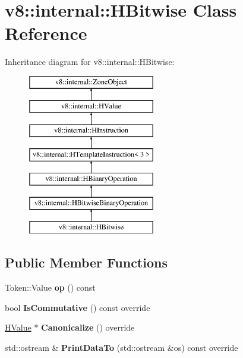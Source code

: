 \hypertarget{classv8_1_1internal_1_1_h_bitwise}{}\section{v8\+:\+:internal\+:\+:H\+Bitwise Class Reference}
\label{classv8_1_1internal_1_1_h_bitwise}
Inheritance diagram for v8\+:\+:internal\+:\+:H\+Bitwise\+:\begin{figure}[H]
\begin{center}
\leavevmode
\includegraphics[height=7.000000cm]{classv8_1_1internal_1_1_h_bitwise}
\end{center}
\end{figure}
\subsection*{Public Member Functions}
\begin{DoxyCompactItemize}
\item 
Token\+::\+Value {\bfseries op} () const \hypertarget{classv8_1_1internal_1_1_h_bitwise_ad141bf769041a02ff3b13ec3ef31aa75}{}\label{classv8_1_1internal_1_1_h_bitwise_ad141bf769041a02ff3b13ec3ef31aa75}

\item 
bool {\bfseries Is\+Commutative} () const  override\hypertarget{classv8_1_1internal_1_1_h_bitwise_a5a018294782fc524947d180dcb3c1a59}{}\label{classv8_1_1internal_1_1_h_bitwise_a5a018294782fc524947d180dcb3c1a59}

\item 
\hyperlink{classv8_1_1internal_1_1_h_value}{H\+Value} $\ast$ {\bfseries Canonicalize} () override\hypertarget{classv8_1_1internal_1_1_h_bitwise_a734b04dea417b9be63b4a92bd1940033}{}\label{classv8_1_1internal_1_1_h_bitwise_a734b04dea417b9be63b4a92bd1940033}

\item 
std\+::ostream \& {\bfseries Print\+Data\+To} (std\+::ostream \&os) const  override\hypertarget{classv8_1_1internal_1_1_h_bitwise_ab6699194930d4619ad1ac672174f117a}{}\label{classv8_1_1internal_1_1_h_bitwise_ab6699194930d4619ad1ac672174f117a}

\end{DoxyCompactItemize}
